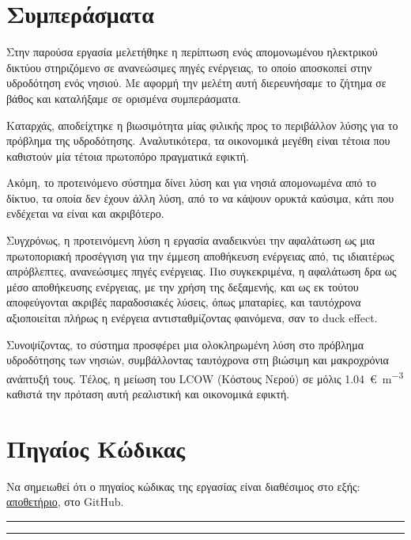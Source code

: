 





\section{Συμπεράσματα}
Στην παρούσα εργασία μελετήθηκε η περίπτωση ενός απομονωμένου ηλεκτρικού
δικτύου στηριζόμενο σε ανανεώσιμες πηγές ενέργειας, το οποίο αποσκοπεί στην
υδροδότηση ενός νησιού. Με αφορμή την μελέτη αυτή διερευνήσαμε το ζήτημα σε
βάθος και καταλήξαμε σε ορισμένα συμπεράσματα.

Καταρχάς, αποδείχτηκε η βιωσιμότητα μίας φιλικής προς το περιβάλλον λύσης για
το πρόβλημα της υδροδότησης. Αναλυτικότερα, τα οικονομικά μεγέθη είναι τέτοια
που καθιστούν μία τέτοια πρωτοπόρο πραγματικά εφικτή.

Ακόμη, το προτεινόμενο σύστημα δίνει λύση και για νησιά απομονωμένα από το
δίκτυο, τα οποία δεν έχουν άλλη λύση, από το να κάψουν ορυκτά καύσιμα, κάτι που
ενδέχεται να είναι και ακριβότερο.

Συγχρόνως, η προτεινόμενη λύση η εργασία αναδεικνύει την αφαλάτωση ως μια
πρωτοποριακή προσέγγιση για την έμμεση αποθήκευση ενέργειας από, τις ιδιαιτέρως
απρόβλεπτες, ανανεώσιμες πηγές ενέργειας. Πιο συγκεκριμένα, η αφαλάτωση δρα ως
μέσο αποθήκευσης ενέργειας, με την χρήση της δεξαμενής, και ως εκ τούτου
αποφεύγονται ακριβές παραδοσιακές λύσεις, όπως μπαταρίες, και ταυτόχρονα
αξιοποιείται πλήρως η ενέργεια αντισταθμίζοντας φαινόμενα, σαν το duck effect.

Συνοψίζοντας, το σύστημα προσφέρει μια ολοκληρωμένη λύση στο πρόβλημα
υδροδότησης των νησιών, συμβάλλοντας ταυτόχρονα στη βιώσιμη και μακροχρόνια
ανάπτυξή τους. Τέλος, η μείωση του LCOW (Κόστους Νερού) σε μόλις
\qty{1.04}{\euro\per\cubic\meter} καθιστά την πρόταση αυτή ρεαλιστική και
οικονομικά εφικτή.

\clearpage
\appendix

\section{Πηγαίος Κώδικας}
Να σημειωθεί ότι ο πηγαίος κώδικας της εργασίας είναι διαθέσιμος στο εξής:
\href{https://github.com/DimitrisDimitropoulos/desalination}{αποθετήριο}, στο
GitHub.

\par\noindent\rule{\textwidth}{0.4pt}

\par\noindent\rule{\textwidth}{0.4pt}


